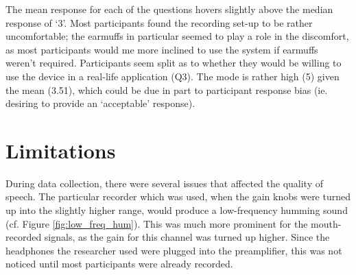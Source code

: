 The mean response for each of the questions hovers slightly above the median response of `3'.  Most participants found the recording set-up to be rather uncomfortable; the earmuffs in particular seemed to play a role in the discomfort, as most participants would me more inclined to use the system if earmuffs weren't required.  Participants seem split as to whether they would be willing to use the device in a real-life application (Q3).  The mode is rather high (5) given the mean (3.51), which could be due in part to participant response bias (ie. desiring to provide an `acceptable' response).



\section{Limitations}
\label{chap2:limitations}

During data collection, there were several issues that affected the quality of speech.  
The particular recorder which was used, when the gain knobs were turned up into the slightly higher range, would produce a low-frequency humming sound (cf. Figure \ref{fig:low_freq_hum}).  This was much more prominent for the mouth-recorded signals, as the gain for this channel was turned up higher.  Since the headphones the researcher used were plugged into the preamplifier, this was not noticed until most participants were already recorded.

